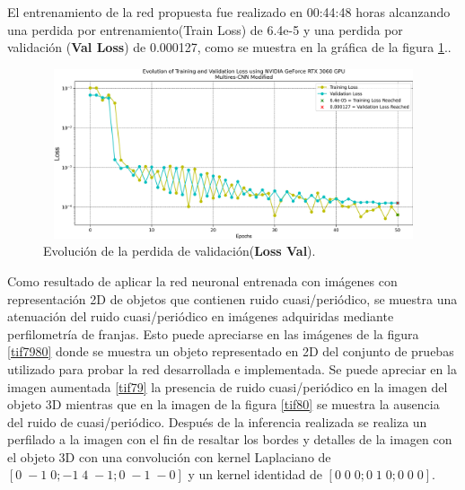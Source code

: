 \documentclass[10pt,letterpaper]{article}
\begin{document}
El entrenamiento de la red propuesta fue realizado en 00:44:48 horas alcanzando una perdida por entrenamiento(Train Loss) de 6.4e-5 y una perdida por validación (\textbf{Val Loss}) de 0.000127, como se muestra en la gráfica de la figura \ref{tif71}..

\begin{figure}[H]
	\centering
    \includegraphics[height=5cm,width=12cm]{tifs/tif71.png}
    \caption{Evolución de la perdida de validación(\textbf{Loss Val}).}
    \label{tif71}
\end{figure}


Como resultado de aplicar la red neuronal entrenada con imágenes con representación 2D de objetos que contienen ruido cuasi/periódico, se muestra una atenuación del ruido cuasi/periódico en imágenes adquiridas mediante perfilometría de franjas. Esto puede apreciarse en las imágenes de la figura \ref{tif7980} donde se muestra un objeto representado en 2D del conjunto de pruebas utilizado para probar la red desarrollada e implementada. Se puede apreciar en la imagen aumentada \ref{tif79} la presencia de ruido cuasi/periódico en la imagen del objeto 3D mientras que en la imagen de la figura \ref{tif80} se muestra la ausencia del ruido de cuasi/periódico. Después de la inferencia realizada se realiza un perfilado a la imagen con el fin de resaltar los bordes y detalles de la imagen con el objeto 3D con una convolución con kernel Laplaciano de $[0\; -1\; 0;-1\; 4\; -1; 0\; -1\; -0]$ y un kernel identidad de $[0\; 0\; 0; 0\; 1\; 0; 0\; 0\; 0]$.
\end{document}
